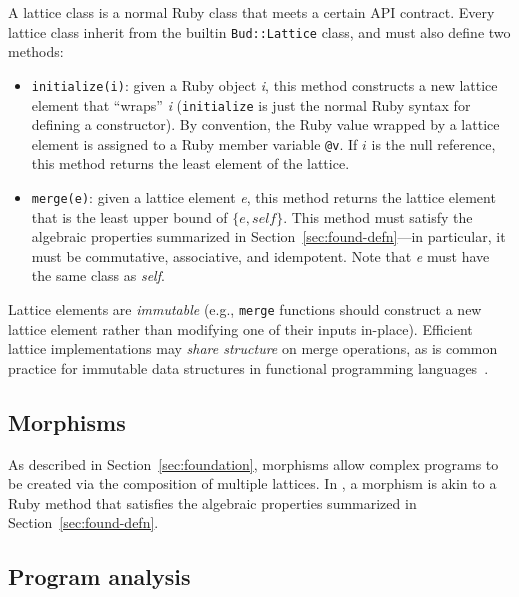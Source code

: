 A lattice class is a normal Ruby class that meets a certain API contract. Every
lattice class inherit from the builtin \texttt{Bud::Lattice} class, and
must also define two methods:
\begin{itemize}
\item \texttt{initialize(i)}: given a Ruby object \emph{i}, this method
  constructs a new lattice element that ``wraps'' \emph{i} (\texttt{initialize}
  is just the normal Ruby syntax for defining a constructor). By convention, the
  Ruby value wrapped by a lattice element is assigned to a Ruby member variable
  \texttt{@v}. If $i$ is the null reference, this method returns the least
  element of the lattice.

\item \texttt{merge(e)}: given a lattice element \emph{e}, this method returns the
  lattice element that is the least upper bound of $\{e, \textit{self}\}$. This method must
  satisfy the algebraic properties summarized in Section~\ref{sec:found-defn}---in
  particular, it must be commutative, associative, and idempotent. Note that
  \emph{e} must have the same class as \emph{self}.
\end{itemize}
Lattice elements are \emph{immutable} (e.g., \texttt{merge} functions should
construct a new lattice element rather than modifying one of their inputs
in-place). Efficient lattice implementations may \emph{share structure} on merge
operations, as is common practice for immutable data structures in functional
programming languages~\cite{Okasaki1999}. %

\subsection{Morphisms}
As described in Section~\ref{sec:foundation}, morphisms allow complex programs
to be created via the composition of multiple lattices. In \lang, a morphism is
akin to a Ruby method that satisfies the algebraic properties summarized in
Section~\ref{sec:found-defn}.

\subsection{Program analysis}

